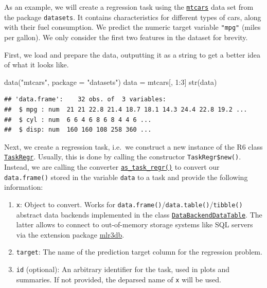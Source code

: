 \documentclass[
]{scrbook}
\newenvironment{Shaded}{\begin{snugshade}}{\end{snugshade}}
\newcommand{\AttributeTok}[1]{\textcolor[rgb]{0.77,0.63,0.00}{#1}}
\newcommand{\DecValTok}[1]{\textcolor[rgb]{0.00,0.00,0.81}{#1}}
\newcommand{\FunctionTok}[1]{\textcolor[rgb]{0.00,0.00,0.00}{#1}}
\newcommand{\NormalTok}[1]{#1}
\newcommand{\OtherTok}[1]{\textcolor[rgb]{0.56,0.35,0.01}{#1}}
\newcommand{\SpecialCharTok}[1]{\textcolor[rgb]{0.00,0.00,0.00}{#1}}
\newcommand{\StringTok}[1]{\textcolor[rgb]{0.31,0.60,0.02}{#1}}
\providecommand{\tightlist}{%
  \setlength{\itemsep}{0pt}\setlength{\parskip}{0pt}}
\renewenvironment{Shaded} {\begin{snugshade}\small} {\end{snugshade}}
\begin{document}
As an example, we will create a regression task using the \href{https://www.rdocumentation.org/packages/datasets/topics/mtcars}{\texttt{mtcars}} data set from the package \texttt{datasets}.
It contains characteristics for different types of cars, along with their fuel consumption.
We predict the numeric target variable \texttt{"mpg"} (miles per gallon).
We only consider the first two features in the dataset for brevity.

First, we load and prepare the data, outputting it as a string to get a better idea of what it looks like.

\begin{Shaded}
\begin{Highlighting}[]
\FunctionTok{data}\NormalTok{(}\StringTok{"mtcars"}\NormalTok{, }\AttributeTok{package =} \StringTok{"datasets"}\NormalTok{)}
\NormalTok{data }\OtherTok{=}\NormalTok{ mtcars[, }\DecValTok{1}\SpecialCharTok{:}\DecValTok{3}\NormalTok{]}
\FunctionTok{str}\NormalTok{(data)}
\end{Highlighting}
\end{Shaded}

\begin{verbatim}
## 'data.frame':    32 obs. of  3 variables:
##  $ mpg : num  21 21 22.8 21.4 18.7 18.1 14.3 24.4 22.8 19.2 ...
##  $ cyl : num  6 6 4 6 8 6 8 4 4 6 ...
##  $ disp: num  160 160 108 258 360 ...
\end{verbatim}

Next, we create a regression task, i.e.~we construct a new instance of the R6 class \href{https://mlr3.mlr-org.com/reference/TaskRegr.html}{\texttt{TaskRegr}}.
Usually, this is done by calling the constructor \texttt{TaskRegr\$new()}.
Instead, we are calling the converter \href{https://mlr3.mlr-org.com/reference/as_task_regr.html}{\texttt{as\_task\_regr()}} to convert our \texttt{data.frame()} stored in the variable \texttt{data} to a task and provide the following information:

\begin{enumerate}
\def\labelenumi{\arabic{enumi}.}
\setcounter{enumi}{1}
\tightlist
\item
  \texttt{x}: Object to convert. Works for \texttt{data.frame()}/\texttt{data.table()}/\texttt{tibble()} abstract data backends implemented in the class \href{https://mlr3.mlr-org.com/reference/DataBackendDataTable.html}{\texttt{DataBackendDataTable}}.
  The latter allows to connect to out-of-memory storage systems like SQL servers via the extension package \href{https://mlr3db.mlr-org.com}{mlr3db}.
\item
  \texttt{target}: The name of the prediction target column for the regression problem.
\item
  \texttt{id} (optional): An arbitrary identifier for the task, used in plots and summaries.
  If not provided, the deparsed name of \texttt{x} will be used.
\end{enumerate}
\end{document}
